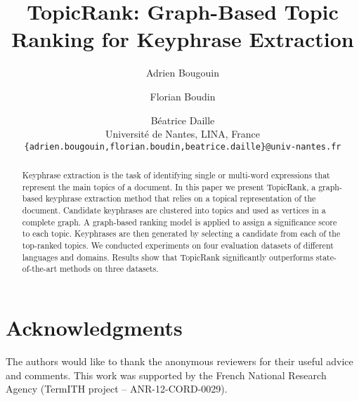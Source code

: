 \documentclass[11pt]{article}
\title{TopicRank: Graph-Based Topic Ranking for Keyphrase Extraction}
\author{
  Adrien Bougouin \and Florian Boudin \and Béatrice Daille\\
  Université de Nantes, LINA, France\\
  {\tt \{adrien.bougouin,florian.boudin,beatrice.daille\}@univ-nantes.fr}
}
\date{}
\begin{document}
  \maketitle

  \begin{abstract}
    Keyphrase extraction is the task of identifying single or multi-word
    expressions that represent the main topics of a document. In this paper we
    present TopicRank, a graph-based keyphrase extraction method that relies on
    a topical representation of the document. Candidate keyphrases are clustered
    into topics and used as vertices in a complete graph. A graph-based ranking
    model is applied to assign a significance score to each topic. Keyphrases
    are then generated by selecting a candidate from each of the top-ranked
    topics. We conducted experiments on four evaluation datasets of different
    languages and domains. Results show that TopicRank significantly outperforms
    state-of-the-art methods on three datasets.
  \end{abstract}

  

  \section*{Acknowledgments}
    The authors would like to thank the anonymous reviewers for their useful
    advice and comments. This work was supported by the French National
    Research Agency (TermITH project -- ANR-12-CORD-0029).

  
  
\end{document}
